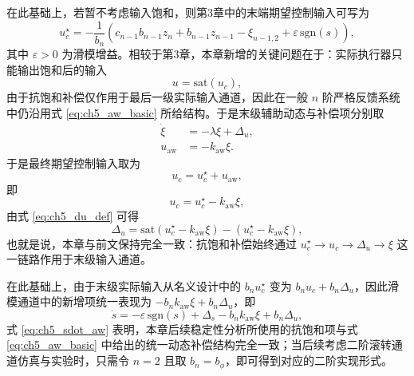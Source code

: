在此基础上，若暂不考虑输入饱和，则第3章中的末端期望控制输入可写为
\begin{equation}\label{eq:ch5_uc_nominal}
u_c^\star=-\frac{1}{b_n}\left(c_{n-1}b_{n-1}z_n+b_{n-1}z_{n-1}-\xi_{n-1,2}
+\varepsilon\,\mathrm{sgn}(s)\right),
\end{equation}
其中 $\varepsilon>0$ 为滑模增益。相较于第3章，本章新增的关键问题在于：实际执行器只能输出饱和后的输入
\begin{equation}
u=\mathrm{sat}(u_c),
\end{equation}
由于抗饱和补偿仅作用于最后一级实际输入通道，因此在一般 $n$ 阶严格反馈系统中仍沿用式 \eqref{eq:ch5_aw_basic} 所给结构。于是末级辅助动态与补偿项分别取
\begin{subequations}
\begin{align}
  \dot \xi &= -\lambda \xi + \Delta_u, \label{eq:ch5_xi_dyn}\\
  u_{\mathrm{aw}} &= -k_{\mathrm{aw}}\xi. \label{eq:ch5_uaw}
\end{align}
\end{subequations}
于是最终期望控制输入取为
\begin{equation}\label{eq:ch5_uc_struct}
  u_c = u_c^\star + u_{\mathrm{aw}},
\end{equation}
\noindent
即
\begin{equation}
u_c=u_c^\star-k_{\mathrm{aw}}\xi,
\end{equation}
由式 \eqref{eq:ch5_du_def} 可得
\begin{equation}
\Delta_u
=
\mathrm{sat}\!\left(u_c^\star-k_{\mathrm{aw}}\xi\right)
-\left(u_c^\star-k_{\mathrm{aw}}\xi\right),
\end{equation}
也就是说，本章与前文保持完全一致：抗饱和补偿始终通过 $u_c^\star \rightarrow u_c \rightarrow \Delta_u \rightarrow \xi$ 这一链路作用于末级输入通道。

在此基础上，由于末级实际输入从名义设计中的 $b_nu_c^\star$ 变为 $b_nu_c+b_n\Delta_u$，因此滑模通道中的新增项统一表现为 $-b_nk_{\mathrm{aw}}\xi+b_n\Delta_u$，即
\begin{equation}\label{eq:ch5_sdot_aw}
  \dot s
  =-\varepsilon\,\mathrm{sgn}(s)+\Delta_s-b_nk_{\mathrm{aw}}\xi+b_n\Delta_u,
\end{equation}
式 \eqref{eq:ch5_sdot_aw} 表明，本章后续稳定性分析所使用的抗饱和项与式 \eqref{eq:ch5_aw_basic} 中给出的统一动态补偿结构完全一致；当后续考虑二阶滚转通道仿真与实验时，只需令 $n=2$ 且取 $b_n=b_{\phi}$，即可得到对应的二阶实现形式。

